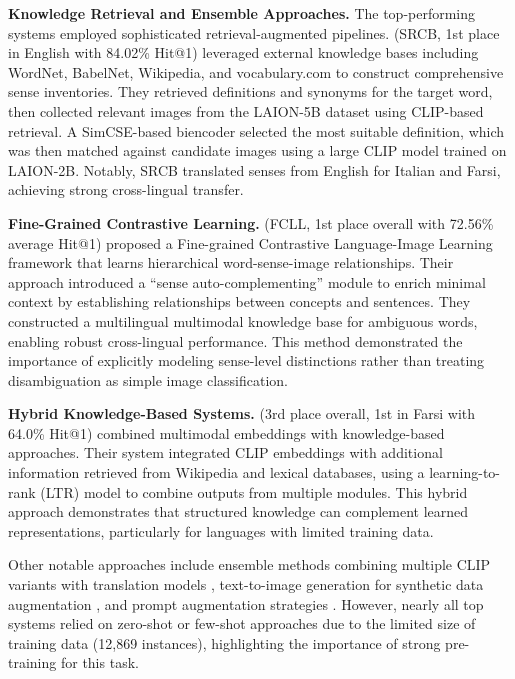 \documentclass[11pt]{article}
\begin{document}
\textbf{Knowledge Retrieval and Ensemble Approaches.} The top-performing systems employed sophisticated retrieval-augmented pipelines. \citet{zhang2023srcb} (SRCB, 1st place in English with 84.02\% Hit@1) leveraged external knowledge bases including WordNet, BabelNet, Wikipedia, and vocabulary.com to construct comprehensive sense inventories. They retrieved definitions and synonyms for the target word, then collected relevant images from the LAION-5B dataset using CLIP-based retrieval. A SimCSE-based biencoder selected the most suitable definition, which was then matched against candidate images using a large CLIP model trained on LAION-2B. Notably, SRCB translated senses from English for Italian and Farsi, achieving strong cross-lingual transfer.

\textbf{Fine-Grained Contrastive Learning.} \citet{yang2023fcll} (FCLL, 1st place overall with 72.56\% average Hit@1) proposed a Fine-grained Contrastive Language-Image Learning framework that learns hierarchical word-sense-image relationships. Their approach introduced a ``sense auto-complementing'' module to enrich minimal context by establishing relationships between concepts and sentences. They constructed a multilingual multimodal knowledge base for ambiguous words, enabling robust cross-lingual performance. This method demonstrated the importance of explicitly modeling sense-level distinctions rather than treating disambiguation as simple image classification.

\textbf{Hybrid Knowledge-Based Systems.} \citet{dadas2023opi} (3rd place overall, 1st in Farsi with 64.0\% Hit@1) combined multimodal embeddings with knowledge-based approaches. Their system integrated CLIP embeddings with additional information retrieved from Wikipedia and lexical databases, using a learning-to-rank (LTR) model to combine outputs from multiple modules. This hybrid approach demonstrates that structured knowledge can complement learned representations, particularly for languages with limited training data.

Other notable approaches include ensemble methods combining multiple CLIP variants with translation models \cite{patil2023rahul}, text-to-image generation for synthetic data augmentation \cite{li2023augmenters}, and prompt augmentation strategies \cite{ghahroodi-etal-2023-sut}. However, nearly all top systems relied on zero-shot or few-shot approaches due to the limited size of training data (12,869 instances), highlighting the importance of strong pre-training for this task.
\end{document}
